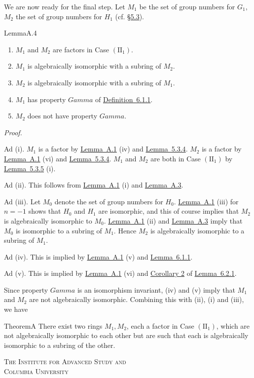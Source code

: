 \documentclass[b5paper,twoside]{article}
\newcommand{\secref}[2]{\hyperref[#1]{\mbox{\S#2}}}
\newcommand{\lemref}[2]{\hyperref[#1]{\mbox{Lemma~#2}}}
\newcommand{\defref}[2]{\hyperref[#1]{\mbox{Definition~#2}}}
\theoremstyle{mvnplain}
\renewenvironment{proof}[1][Proof]{%
  \par\addvspace{0.35\baselineskip}%
  \noindent\textit{#1.}\ \normalfont\ignorespaces
}{%
  \par\addvspace{0.35\baselineskip}%
}
\newcommand{\M}{\mathbf M}
\def\M{M}%
\def\Gamma{Gamma}%
\def\mathfrak#1{#1}%
\begin{document}
We are now ready for the final step. Let $\M_1$ be the set of group numbers
for $\mathfrak G_1$, $\M_2$ the set of group numbers for
$\mathfrak H_1$ (cf. \secref{sec:5.3}{5.3}).

\begin{namedstatement}{Lemma}{A.4}\label{lem:A.4}
\begin{enumerate}[label=(\roman*),leftmargin=3em]
\item $\M_1$ and $\M_2$ are factors in Case $(\mathrm{II}_1)$.
\item $\M_1$ is algebraically isomorphic with a subring of $\M_2$.
\item $\M_2$ is algebraically isomorphic with a subring of $\M_1$.
\item $\M_1$ has property $\Gamma$ of \defref{def:6.1.1}{6.1.1}.
\item $\M_2$ does not have property $\Gamma$.
\end{enumerate}
\end{namedstatement}

\begin{proof}
Ad (i). $\M_1$ is a factor by \lemref{lem:A.1}{A.1} (iv) and
\lemref{lem:5.3.4}{5.3.4}. $\M_2$ is a factor by \lemref{lem:A.1}{A.1} (vi)
and \lemref{lem:5.3.4}{5.3.4}. $\M_1$ and $\M_2$ are both in Case
$(\mathrm{II}_1)$ by \lemref{lem:5.3.5}{5.3.5} (i).

Ad (ii). This follows from \lemref{lem:A.1}{A.1} (i) and
\lemref{lem:A.3}{A.3}.

Ad (iii). Let $\M_0$ denote the set of group numbers for
$\mathfrak H_0$. \lemref{lem:A.1}{A.1} (iii) for $n=-1$ shows
that $\mathfrak H_0$ and $\mathfrak H_1$ are
isomorphic, and this of course implies that $\M_2$ is algebraically isomorphic
to $\M_0$. \lemref{lem:A.1}{A.1} (ii) and \lemref{lem:A.3}{A.3} imply that
$\M_0$ is isomorphic to a subring of $\M_1$. Hence $\M_2$ is algebraically
isomorphic to a subring of $\M_1$.

Ad (iv). This is implied by \lemref{lem:A.1}{A.1} (v) and
\lemref{lem:6.1.1}{6.1.1}.

Ad (v). This is implied by \lemref{lem:A.1}{A.1} (vi) and
\hyperref[cor:6.2.2]{Corollary 2} of
\lemref{lem:6.2.1}{6.2.1}.

Since property $\Gamma$ is an isomorphism invariant, (iv) and (v) imply that
$\M_1$ and $\M_2$ are not algebraically isomorphic. Combining this with (ii),
(i) and (iii), we have
\end{proof}

\begin{namedstatement}{Theorem}{A}\label{thm:A}
There exist two rings $\M_1,\M_2$, each a factor in Case $(\mathrm{II}_1)$,
which are not algebraically isomorphic to each other but are such that each is
algebraically isomorphic to a subring of the other.
\end{namedstatement}

\bigskip
\noindent\textsc{The Institute for Advanced Study and}\\
\textsc{Columbia University}
\end{document}
